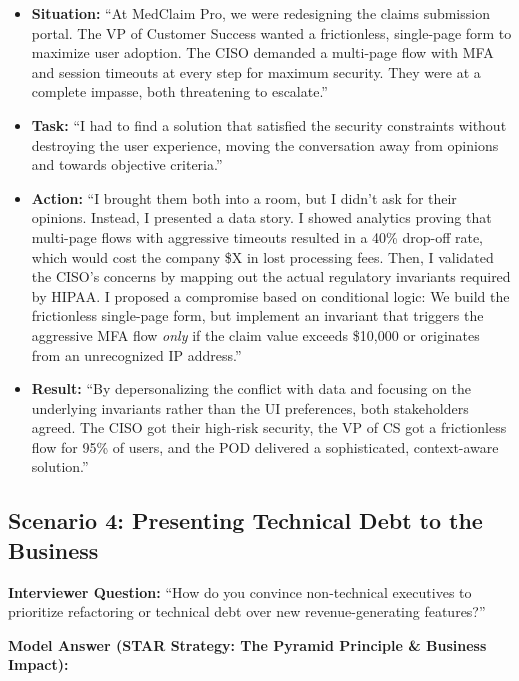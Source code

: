 \begin{itemize}
\tightlist
\item
  \textbf{Situation:} ``At MedClaim Pro, we were redesigning the claims
  submission portal. The VP of Customer Success wanted a frictionless,
  single-page form to maximize user adoption. The CISO demanded a
  multi-page flow with MFA and session timeouts at every step for
  maximum security. They were at a complete impasse, both threatening to
  escalate.''
\item
  \textbf{Task:} ``I had to find a solution that satisfied the security
  constraints without destroying the user experience, moving the
  conversation away from opinions and towards objective criteria.''
\item
  \textbf{Action:} ``I brought them both into a room, but I didn't ask
  for their opinions. Instead, I presented a data story. I showed
  analytics proving that multi-page flows with aggressive timeouts
  resulted in a 40\% drop-off rate, which would cost the company \$X in
  lost processing fees. Then, I validated the CISO's concerns by mapping
  out the actual regulatory invariants required by HIPAA. I proposed a
  compromise based on conditional logic: We build the frictionless
  single-page form, but implement an invariant that triggers the
  aggressive MFA flow \emph{only} if the claim value exceeds \$10,000 or
  originates from an unrecognized IP address.''
\item
  \textbf{Result:} ``By depersonalizing the conflict with data and
  focusing on the underlying invariants rather than the UI preferences,
  both stakeholders agreed. The CISO got their high-risk security, the
  VP of CS got a frictionless flow for 95\% of users, and the POD
  delivered a sophisticated, context-aware solution.''
\end{itemize}

\subsection{Scenario 4: Presenting Technical Debt to the
Business}\label{scenario-4-presenting-technical-debt-to-the-business}

\textbf{Interviewer Question:} ``How do you convince non-technical
executives to prioritize refactoring or technical debt over new
revenue-generating features?''

\textbf{Model Answer (STAR Strategy: The Pyramid Principle \& Business
Impact):}


